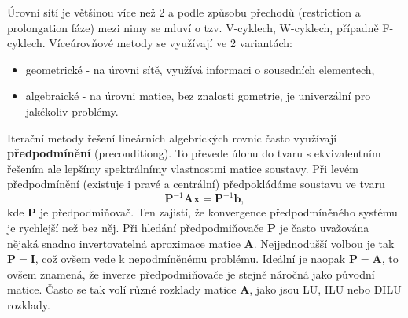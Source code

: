 \documentclass[a4paper,12pt]{report}
\theoremstyle{remark}
\begin{document}
Úrovní sítí je většinou více než 2 a podle způsobu přechodů (restriction a prolongation fáze) mezi nimy se mluví o tzv. V-cyklech, W-cyklech, případně F-cyklech. Víceúrovňové metody se využívají ve 2 variantách:
\begin{itemize}
	\item geometrické - na úrovni sítě, využívá informaci o sousedních elementech,
	\item algebraické - na úrovni matice, bez znalosti gometrie, je univerzální pro jakékoliv problémy.
\end{itemize}
	

	
		
	Iterační metody řešení lineárních algebrických rovnic často využívají \textbf{předpodmínění} (preconditiong). To převede úlohu do tvaru s ekvivalentním řešením ale lepšímy spektrálnímy vlastnostmi matice soustavy.  Při levém předpodmínění (existuje i pravé a centrální) předpokládáme soustavu ve tvaru
	$$\boldsymbol{P}^{-1}\boldsymbol{A}\boldsymbol{x} =\boldsymbol{P}^{-1}\boldsymbol{b},$$
	kde $\boldsymbol{P}$ je předpodmiňovač. Ten zajistí, že konvergence předpodmíněného systému je rychlejší než bez něj. Při hledání předpodmiňovače $\boldsymbol{P}$ je často uvažována nějaká snadno invertovatelná aproximace matice $\boldsymbol{A}$. Nejjednodušší volbou je tak $\boldsymbol{P} = \boldsymbol{I}$, což ovšem vede k nepodmíněnému problému. Ideální je naopak $\boldsymbol{P} = \boldsymbol{A}$, to ovšem znamená, že inverze předpodmiňovače je stejně náročná jako původní matice. Často se tak volí různé rozklady matice $\boldsymbol{A}$, jako jsou LU, ILU nebo DILU rozklady.
	
\end{document}
